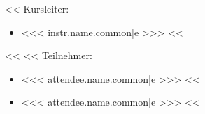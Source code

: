                 \begin{minipage}[t]{0.5\textwidth}
                    <<%
                        Kursleiter:
                        \begin{itemize}
                            <<%
                                \item <<< instr.name.common|e >>>
                            <<%
                        \end{itemize}
                    <<%
                    <<%
                    Teilnehmer:
                    \begin{itemize}
                        <<%
                            \item <<< attendee.name.common|e >>>
                        <<%
                    \end{itemize}
                \end{minipage}%
                \begin{minipage}[t]{0.5\textwidth}
                    \begin{itemize}
                        <<%
                            \item <<< attendee.name.common|e >>>
                        <<%
                    \end{itemize}
                \end{minipage}

